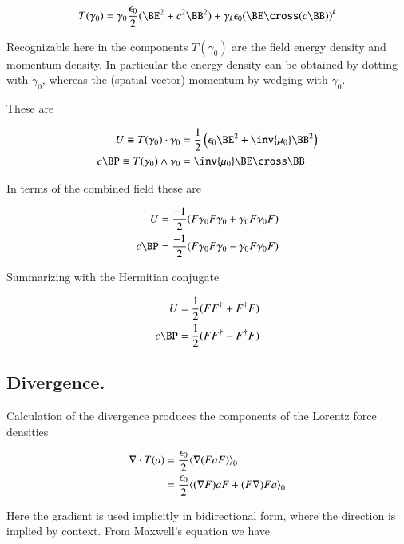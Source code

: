 \begin{align}
T(\gamma_0)
&=
\gamma_0 \frac{\epsilon_0}{2} (\BE^2 + c^2 \BB^2) + \gamma_k \epsilon_0 (\BE \cross (c \BB))^k \\
\end{align}

Recognizable here in the components $T(\gamma_0)$ are the field energy density and momentum density.  In particular the energy density can be obtained by dotting with $\gamma_0$, whereas the (spatial vector) momentum by wedging with $\gamma_0$.

These are

\begin{align}
U \equiv T(\gamma_0) \cdot \gamma_0 &= \frac{1}{2} \left( \epsilon_0 \BE^2 + \inv{\mu_0} \BB^2 \right) \\
c \BP \equiv T(\gamma_0) \wedge \gamma_0 &= \inv{\mu_0} \BE \cross \BB
\end{align}

In terms of the combined field these are

\begin{align}
U &= \frac{-1}{2}( F \gamma_0 F \gamma_0 + \gamma_0 F \gamma_0 F) \\
c \BP &= \frac{-1}{2}( F \gamma_0 F \gamma_0 - \gamma_0 F \gamma_0 F)
\end{align}

Summarizing with the Hermitian conjugate

\begin{align}
U &= \frac{1}{2}( F F^\dagger + F^\dagger F) \\
c \BP &= \frac{1}{2}( F F^\dagger - F^\dagger F)
\end{align}

\subsection{ Divergence. }

Calculation of the divergence produces the components of the Lorentz force densities

\begin{align*}
\nabla \cdot T(a)
&= \frac{\epsilon_0}{2} {\left\langle{{ \nabla(F a F) }}\right\rangle}_{0} \\
&= \frac{\epsilon_0}{2} {\left\langle{{ (\nabla F) a F + (F \nabla) F a }}\right\rangle}_{0} \\
\end{align*}

Here the gradient is used implicitly in bidirectional form, where the direction is implied by context.  From Maxwell's equation we have

